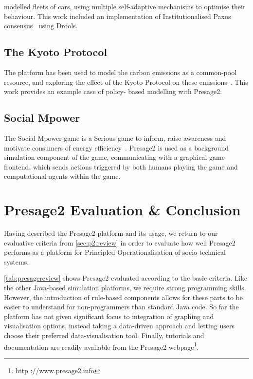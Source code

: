 \citet{Sanderson2013} modelled fleets of cars, using multiple self-adaptive
mechanisms to optimise their behaviour. This work included an implementation
of Institutionalised Paxos consensus~\citep{Sanderson2012} using Drools.

\subsection{The Kyoto Protocol}

The platform has been used to model the carbon emissions as a common-pool
resource, and exploring the effect of the Kyoto Protocol on these
emissions~\citep{Macbeth2014}. This work provides an example case of policy-
based modelling with Presage2.

\subsection{Social Mpower}

The Social Mpower game is a Serious game to inform, raise awareness and motivate
consumers of energy efficiency~\citep{Bourazeri2014}. Presage2 is used as a
background simulation component of the game, communicating with a graphical game
frontend, which sends actions triggered by both humans playing the game and
computational agents within the game.

\section{Presage2 Evaluation \& Conclusion}

Having described the Presage2 platform and its usage, we return to our
evaluative criteria from \autoref{sec:p2:review} in order to evaluate how
well Presage2 performs as a platform for Principled Operationalisation of 
socio-technical systems.

\autoref{tab:presagereview} shows Presage2 evaluated according to the basic
criteria. Like the other Java-based simulation platforms, we require strong
programming skills. However, the introduction of rule-based components allows
for these parts to be easier to understand for non-programmers than standard
Java code. So far the platform has not given significant focus to integration of
graphing and visualisation options, instead taking a data-driven approach and
letting users choose their preferred data-visualisation tool. Finally, tutorials
and documentation are readily available from the Presage2 webpage\footnote{http
://www.presage2.info}.

